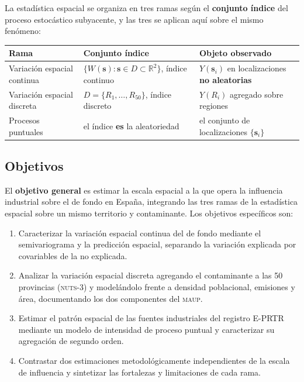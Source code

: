 \documentclass[11pt,a4paper]{article}
\newcommand{\dom}{D}
\newcommand{\loc}{\bm{s}}
\newcommand{\loci}[1]{\bm{s}_{#1}}
\newcommand{\Wp}[1]{W(#1)}
\newcommand{\Yp}[1]{Y(#1)}
\begin{document}
La estadística espacial se organiza en tres ramas según el \textbf{conjunto
índice} del proceso estocástico subyacente, y las tres se aplican aquí sobre el
mismo fenómeno:

\begin{table}[h]
\centering
\small
\begin{tabular}{@{}p{3.6cm}p{5.4cm}p{5.4cm}@{}}
\toprule
\textbf{Rama} & \textbf{Conjunto índice} & \textbf{Objeto observado} \\
\midrule
Variación espacial continua &
$\{\Wp{\loc} : \loc \in \dom \subset \mathbb{R}^2\}$, índice continuo &
$\Yp{\loci{i}}$ en localizaciones \textbf{no aleatorias} \\
\addlinespace
Variación espacial discreta &
$\dom = \{R_1,\dots,R_{50}\}$, índice discreto &
$\Yp{R_i}$ agregado sobre regiones \\
\addlinespace
Procesos puntuales &
el índice \textbf{es} la aleatoriedad &
el conjunto de localizaciones $\{\loci{i}\}$ \\
\bottomrule
\end{tabular}
\end{table}

\subsection*{Objetivos}

El \textbf{objetivo general} es estimar la escala espacial a la que opera la
influencia industrial sobre el  de fondo en España, integrando las tres
ramas de la estadística espacial sobre un mismo territorio y contaminante. Los
objetivos específicos son:

\begin{enumerate}[label=\alph*), leftmargin=1.4em, itemsep=2pt]
  \item Caracterizar la variación espacial continua del  de fondo
  mediante el semivariograma y la predicción espacial, separando la variación
  explicada por covariables de la no explicada.
  \item Analizar la variación espacial discreta agregando el contaminante a las
  \num{50} provincias (\textsc{nuts}-3) y modelándolo frente a densidad
  poblacional, emisiones y área, documentando los dos componentes del
  \textsc{maup}.
  \item Estimar el patrón espacial de las fuentes industriales del registro
  E-PRTR mediante un modelo de intensidad de proceso puntual y caracterizar su
  agregación de segundo orden.
  \item Contrastar dos estimaciones metodológicamente independientes de la
  escala de influencia y sintetizar las fortalezas y limitaciones de cada rama.
\end{enumerate}
\end{document}

